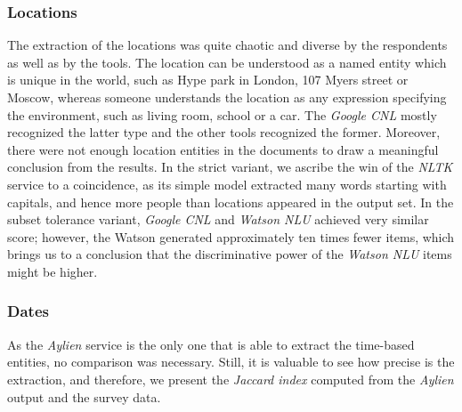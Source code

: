 \documentclass[
  digital, %
  notable,   %
  nolof,     %
  nolot,     %
]{fithesis3}
\begin{document}
\subsubsection{\textbf{Locations}}
The extraction of the locations was quite chaotic and diverse by the respondents as well as by the tools.
The location can be understood as a named entity which is unique in the world, such as Hype park in London, 107 Myers street or Moscow, whereas someone understands the location as any expression specifying the environment, such as living room, school or a car.
The \textit{Google CNL} mostly recognized the latter type and the other tools recognized the former.
Moreover, there were not enough location entities in the documents to draw a meaningful conclusion from the results.
In the strict variant, we ascribe the win of the \textit{NLTK} service to a coincidence, as its simple model extracted many words starting with capitals, and hence more people than locations appeared in the output set.
In the subset tolerance variant, \textit{Google CNL} and \textit{Watson NLU} achieved very similar score; however, the Watson generated approximately ten times fewer items, which brings us to a conclusion that the discriminative power of the \textit{Watson NLU} items might be higher.

\subsubsection{\textbf{Dates}}
As the \textit{Aylien} service is the only one that is able to extract the time-based entities, no comparison was necessary.
Still, it is valuable to see how precise is the extraction, and therefore, we present the \textit{Jaccard index} computed from the \textit{Aylien} output and the survey data.
\end{document}
